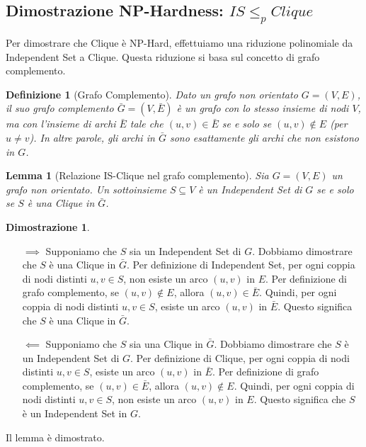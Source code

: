 \documentclass[a4paper, 11pt]{book} %
\newtheorem{definition}[theorem]{Definizione}
\newtheorem{lemma}[theorem]{Lemma}
\theoremstyle{definition}
\newtheorem*{proof*}{Dimostrazione}
\begin{document}
\subsection{Dimostrazione NP-Hardness: $IS \le_p Clique$}

Per dimostrare che Clique è NP-Hard, effettuiamo una riduzione polinomiale da Independent Set a Clique. Questa riduzione si basa sul concetto di grafo complemento.

\begin{definition}[Grafo Complemento]
Dato un grafo non orientato $G=(V, E)$, il suo \emph{grafo complemento} $\bar{G}=(V, \bar{E})$ è un grafo con lo stesso insieme di nodi $V$, ma con l'insieme di archi $\bar{E}$ tale che $(u, v) \in \bar{E}$ se e solo se $(u, v) \notin E$ (per $u \ne v$). In altre parole, gli archi in $\bar{G}$ sono esattamente gli archi che non esistono in $G$.
\end{definition}

\begin{lemma}[Relazione IS-Clique nel grafo complemento]
Sia $G=(V, E)$ un grafo non orientato. Un sottoinsieme $S \subseteq V$ è un Independent Set di $G$ se e solo se $S$ è una Clique in $\bar{G}$.
\end{lemma}

\begin{proof*}
\begin{itemize}
    \item[$\implies$] Supponiamo che $S$ sia un Independent Set di $G$.
    Dobbiamo dimostrare che $S$ è una Clique in $\bar{G}$.
    Per definizione di Independent Set, per ogni coppia di nodi distinti $u, v \in S$, non esiste un arco $(u, v)$ in $E$.
    Per definizione di grafo complemento, se $(u, v) \notin E$, allora $(u, v) \in \bar{E}$.
    Quindi, per ogni coppia di nodi distinti $u, v \in S$, esiste un arco $(u, v)$ in $\bar{E}$. Questo significa che $S$ è una Clique in $\bar{G}$.

    \item[$\impliedby$] Supponiamo che $S$ sia una Clique in $\bar{G}$.
    Dobbiamo dimostrare che $S$ è un Independent Set di $G$.
    Per definizione di Clique, per ogni coppia di nodi distinti $u, v \in S$, esiste un arco $(u, v)$ in $\bar{E}$.
    Per definizione di grafo complemento, se $(u, v) \in \bar{E}$, allora $(u, v) \notin E$.
    Quindi, per ogni coppia di nodi distinti $u, v \in S$, non esiste un arco $(u, v)$ in $E$. Questo significa che $S$ è un Independent Set in $G$.
\end{itemize}
Il lemma è dimostrato.
\end{proof*}
\end{document}
